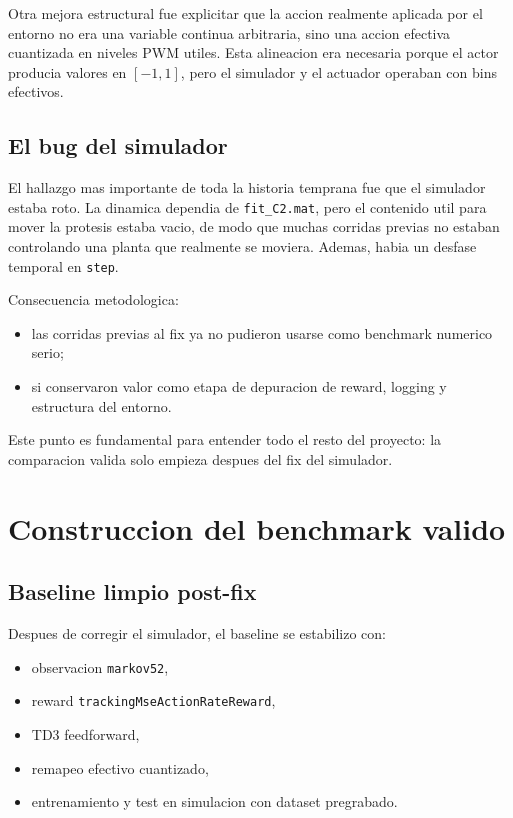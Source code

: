 \documentclass[11pt,a4paper]{article}
\begin{document}
Otra mejora estructural fue explicitar que la accion realmente aplicada por el entorno no era una variable continua arbitraria, sino una accion efectiva cuantizada en niveles PWM utiles. Esta alineacion era necesaria porque el actor producia valores en \([-1,1]\), pero el simulador y el actuador operaban con bins efectivos.

\subsection{El bug del simulador}

El hallazgo mas importante de toda la historia temprana fue que el simulador estaba roto. La dinamica dependia de \texttt{fit\_C2.mat}, pero el contenido util para mover la protesis estaba vacio, de modo que muchas corridas previas no estaban controlando una planta que realmente se moviera. Ademas, habia un desfase temporal en \texttt{step}.

Consecuencia metodologica:
\begin{itemize}[leftmargin=1.5em]
\item las corridas previas al fix ya no pudieron usarse como benchmark numerico serio;
\item si conservaron valor como etapa de depuracion de reward, logging y estructura del entorno.
\end{itemize}

Este punto es fundamental para entender todo el resto del proyecto: la comparacion valida solo empieza despues del fix del simulador.

\section{Construccion del benchmark valido}

\subsection{Baseline limpio post-fix}

Despues de corregir el simulador, el baseline se estabilizo con:
\begin{itemize}[leftmargin=1.5em]
\item observacion \texttt{markov52},
\item reward \texttt{trackingMseActionRateReward},
\item TD3 feedforward,
\item remapeo efectivo cuantizado,
\item entrenamiento y test en simulacion con dataset pregrabado.
\end{itemize}
\end{document}
